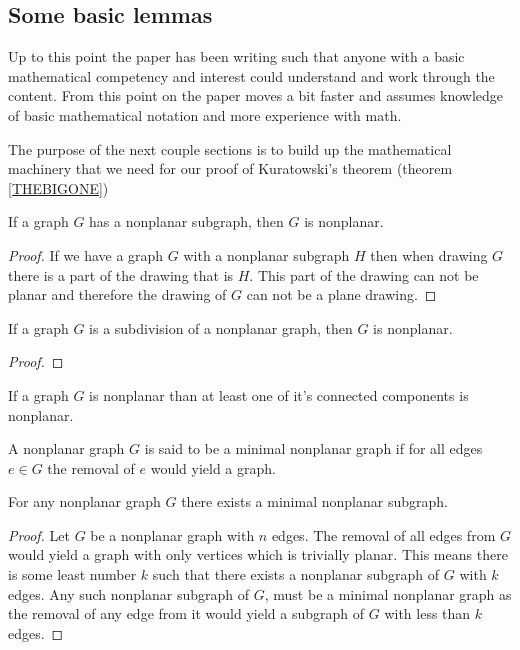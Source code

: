 \documentclass{article}
\begin{document}
\subsection{Some basic lemmas}
Up to this point the paper has been writing such that anyone with a basic mathematical competency and interest could understand and work through the content. From this point on the paper moves a bit faster and assumes knowledge of basic mathematical notation and more experience with math.

The purpose of the next couple sections is to build up the mathematical machinery that we need for our proof of Kuratowski's theorem (theorem \ref{THEBIGONE})

\begin{lemma} \label{subgraph}
	If a graph $G$ has a nonplanar subgraph, then $G$ is nonplanar.
\end{lemma}

\begin{proof}
	If we have a graph $G$ with a nonplanar subgraph $H$ then when drawing $G$ there is a part of the drawing that is $H$. This part of the drawing can not be planar and therefore the drawing of $G$ can not be a plane drawing.
\end{proof}

\begin{lemma} \label{subdivision}
	If a graph $G$ is a subdivision of a nonplanar graph, then $G$ is nonplanar.
\end{lemma}

\begin{proof}
	
\end{proof}

\begin{lemma} \label{component}
	If a graph $G$ is nonplanar than at least one of it's connected components is nonplanar.
\end{lemma}

\begin{definition}
	A nonplanar graph $G$ is said to be a minimal nonplanar graph if for all edges $e\in G$ the removal of $e$ would yield a  graph.
\end{definition}


\begin{lemma}
	For any nonplanar graph $G$ there exists a minimal nonplanar subgraph.
\end{lemma}
\begin{proof}
	Let $G$ be a nonplanar graph with $n$ edges. The removal of all edges from $G$ would yield a graph with only vertices which is trivially planar. This means there is some least number $k$ such that there exists a nonplanar subgraph of $G$ with $k$ edges. Any such nonplanar subgraph of $G$, must be a minimal nonplanar graph as the removal of any edge from it would yield a subgraph of $G$ with less than $k$ edges.
\end{proof}
\end{document}
